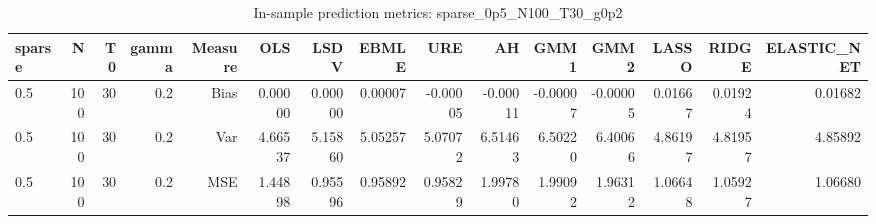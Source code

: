 \begin{table}[!htbp]\centering
\caption{In-sample prediction metrics: sparse_0p5_N100_T30_g0p2}
\label{tab:table2_sparse_0p5_N100_T30_g0p2}
\begin{tabular}{lrrrrrrrrrrrrrr}
\hline
sparse & N & T0 & gamma & Measure & OLS & LSDV & EBMLE & URE & AH & GMM1 & GMM2 & LASSO & RIDGE & ELASTIC_NET \\
\hline
0.5 & 100 & 30 & 0.2 & Bias & 0.00000 & 0.00000 & 0.00007 & -0.00005 & -0.00011 & -0.00007 & -0.00005 & 0.01667 & 0.01924 & 0.01682 \\
0.5 & 100 & 30 & 0.2 & Var & 4.66537 & 5.15860 & 5.05257 & 5.07072 & 6.51463 & 6.50220 & 6.40066 & 4.86197 & 4.81957 & 4.85892 \\
0.5 & 100 & 30 & 0.2 & MSE & 1.44898 & 0.95596 & 0.95892 & 0.95829 & 1.99780 & 1.99092 & 1.96312 & 1.06648 & 1.05927 & 1.06680 \\
\hline
\end{tabular}
\end{table}

